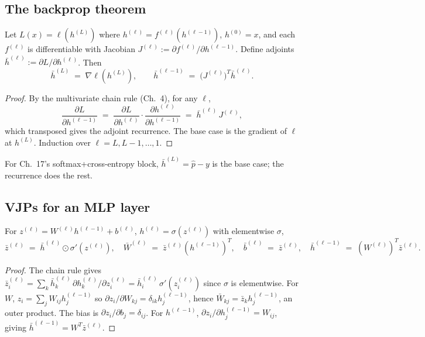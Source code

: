 \subsection*{The backprop theorem}

\begin{theorem}[Backprop $=$ reverse-mode AD on a feedforward net]
Let $L(x)=\ell(h^{(L)})$ where $h^{(\ell)}=f^{(\ell)}(h^{(\ell-1)})$,
$h^{(0)}=x$, and each $f^{(\ell)}$ is differentiable with Jacobian
$J^{(\ell)} := \partial f^{(\ell)}/\partial h^{(\ell-1)}$. Define adjoints
$\bar h^{(\ell)} := \partial L/\partial h^{(\ell)}$. Then
\[
  \bar h^{(L)} \;=\; \nabla\ell(h^{(L)}),
  \qquad
  \bar h^{(\ell-1)} \;=\; \bigl(J^{(\ell)}\bigr)^{T} \bar h^{(\ell)}.
\]
\end{theorem}

\begin{proof}
By the multivariate chain rule (Ch.~4), for any $\ell$,
\[
  \frac{\partial L}{\partial h^{(\ell-1)}}
  \;=\; \frac{\partial L}{\partial h^{(\ell)}}\cdot\frac{\partial h^{(\ell)}}{\partial h^{(\ell-1)}}
  \;=\; \bar h^{(\ell)}\,J^{(\ell)},
\]
which transposed gives the adjoint recurrence. The base case is the gradient
of $\ell$ at $h^{(L)}$. Induction over $\ell=L,L-1,\dots,1$.
\end{proof}

\begin{remark}
For Ch.~17's softmax+cross-entropy block, $\bar h^{(L)}=\hat p-y$ is the base
case; the recurrence does the rest.
\end{remark}

\subsection*{VJPs for an MLP layer}

\begin{proposition}
For $z^{(\ell)}=W^{(\ell)}h^{(\ell-1)}+b^{(\ell)}$, $h^{(\ell)}=\sigma(z^{(\ell)})$
with elementwise $\sigma$,
\[
  \bar z^{(\ell)} \;=\; \bar h^{(\ell)} \odot \sigma'(z^{(\ell)}),
\quad
  \bar W^{(\ell)} \;=\; \bar z^{(\ell)} (h^{(\ell-1)})^{T},
\quad
  \bar b^{(\ell)} \;=\; \bar z^{(\ell)},
\quad
  \bar h^{(\ell-1)} \;=\; (W^{(\ell)})^{T}\bar z^{(\ell)}.
\]
\end{proposition}

\begin{proof}
The chain rule gives
$\bar z^{(\ell)}_i = \sum_k \bar h^{(\ell)}_k\,\partial h^{(\ell)}_k/\partial z^{(\ell)}_i
 = \bar h^{(\ell)}_i\,\sigma'(z^{(\ell)}_i)$
since $\sigma$ is elementwise. For $W$, $z_i = \sum_j W_{ij} h^{(\ell-1)}_j$ so
$\partial z_i/\partial W_{kj}=\delta_{ik}h^{(\ell-1)}_j$, hence
$\bar W_{kj}=\bar z_k h^{(\ell-1)}_j$, an outer product. The bias is
$\partial z_i/\partial b_j=\delta_{ij}$. For $h^{(\ell-1)}$,
$\partial z_i/\partial h^{(\ell-1)}_j=W_{ij}$, giving
$\bar h^{(\ell-1)}=W^{T}\bar z^{(\ell)}$.
\end{proof}

